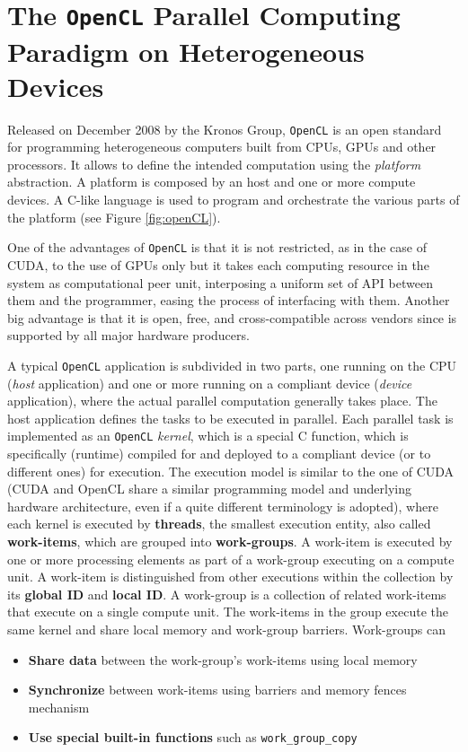     
    \section{The \texttt{OpenCL} Parallel Computing Paradigm on Heterogeneous Devices}
    Released on December 2008 by the Kronos Group, \texttt{OpenCL} \cite{Gaster:2011:HCO:2046379,Stone:2010:OPP:622179.1803953,Munshi:2011:OPG:2049883} is an open standard for programming heterogeneous computers built from CPUs, GPUs and other processors. It allows to define the intended computation using the \textit{platform} abstraction. A platform is composed by an host and one or more compute devices. A C-like language is used to program and orchestrate the various parts of the platform (see Figure \ref{fig:openCL}).
    
    One of the advantages of \texttt{OpenCL} is that it is not restricted, as in the case of CUDA\cite{NvidiaprogGuide}, to the use of GPUs only but it takes each computing resource in the system as computational peer unit, interposing a uniform set of API between them and the programmer, easing the process of interfacing with them. Another big advantage is that it is  open, free, and cross-compatible across vendors since is supported by all major hardware producers.
    
    A typical \texttt{OpenCL} application is subdivided in two parts, one
    running on the CPU (\textit{host} application) and one or more running on a
    compliant device (\textit{device} application), where the actual parallel
    computation generally takes place. The host application defines
    the tasks to be executed in parallel. Each parallel task is
    implemented as an \texttt{OpenCL} \emph{kernel}, which is a special C
    function, which is specifically (runtime) compiled for and deployed to a compliant device (or to different ones) for execution. The execution model is similar to the one of CUDA (CUDA and OpenCL share a similar programming model and underlying hardware architecture, even if a quite different terminology is adopted), where each kernel is executed by \textbf{threads}, the smallest execution entity, also called \textbf{work-items}, which are grouped into \textbf{work-groups}. A work-item is executed by one or more processing elements as part of a work-group executing on a compute unit. A work-item is distinguished from other executions within the collection by its \textbf{global ID} and \textbf{local ID}.
    A work-group is a collection of related work-items that execute on a single compute unit. The work-items in the group execute the same kernel and share local memory and work-group barriers.
    Work-groups can 
    \begin{itemize}
		\item \textbf{Share data} between the work-group's work-items using local memory
		\item \textbf{Synchronize} between work-items using barriers and memory fences mechanism
		\item \textbf{Use special built-in functions} such as \texttt{work\_group\_copy}
    \end{itemize}

